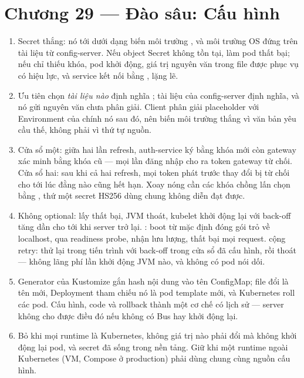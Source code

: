 \section*{Chương 29 --- Đào sâu: Cấu hình}
\begin{enumerate}
  \item Secret thắng: nó tới dưới dạng biến môi trường
  , và môi trường OS đứng trên tài
  liệu từ config-server. Nếu object Secret không tồn tại,
   làm pod thất bại; nếu chỉ thiếu khóa, pod khởi động,
  giá trị  nguyên văn trong file được phục vụ có hiệu lực,
  và service kết nối bằng , lặng lẽ.
  \item Ưu tiên chọn \emph{tài liệu nào} định nghĩa
  ; tài liệu của config-server định nghĩa, và
  nó gửi nguyên văn  chưa
  phân giải. Client phân giải placeholder với Environment của chính nó
  sau đó, nên biến môi trường thắng vì văn bản yêu cầu thế, không phải
  vì thứ tự nguồn.
  \item Cửa sổ một: giữa hai lần refresh, auth-service ký bằng khóa mới
  còn gateway xác minh bằng khóa cũ --- mọi lần đăng nhập cho ra token
  gateway từ chối. Cửa sổ hai: sau khi cả hai refresh, mọi token phát
  trước thay đổi bị từ chối cho tới lúc đằng nào cũng hết hạn. Xoay
  nóng cần các khóa chồng lấn chọn bằng , thứ một secret
  HS256 dùng chung không diễn đạt được.
  \item Không optional: lấy thất bại, JVM thoát, kubelet khởi động lại
  với back-off tăng dần cho tới khi server trở lại. :
  boot từ mặc định đóng gói trỏ về localhost, qua readiness probe, nhận
  lưu lượng, thất bại mọi request.  cộng retry: thử lại
  trong tiến trình với back-off trong cửa sổ đã cấu hình, rồi thoát ---
  không lãng phí lần khởi động JVM nào, và không có pod nói dối.
  \item Generator của Kustomize gắn hash nội dung vào tên ConfigMap;
  file đổi là tên mới, Deployment tham chiếu nó là pod template mới, và
  Kubernetes roll các pod. Cấu hình, code và rollback thành một cơ chế
  có lịch sử --- server không cho được điều đó nếu không có Bus hay
  khởi động lại.
  \item Bỏ khi mọi runtime là Kubernetes, không giá trị nào phải đổi mà
  không khởi động lại pod, và secret đã sống trong nền tảng. Giữ khi
  một runtime ngoài Kubernetes (VM, Compose ở production) phải dùng
  chung cùng nguồn cấu hình.
\end{enumerate}

